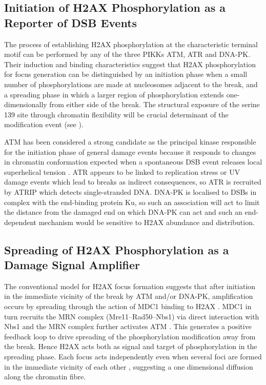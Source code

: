 \subsection{Initiation of H2AX Phosphorylation as a Reporter of DSB Events}
The process of establishing H2AX phosphorylation at the characteristic
terminal motif can be performed by any of the three PIKKs ATM, ATR and
DNA-PK\@. Their induction and binding characteristics suggest that
H2AX phosphorylation for focus generation can be distinguished by an
initiation phase when a small number of phosphorylations are made at
nucleosomes adjacent to the break, and a spreading phase in which a
larger region of phosphorylation extends one-dimensionally from either
side of the break.
The structural exposure of the serine 139 site through chromatin
flexibility will be crucial determinant of the modification event (see
).

ATM has been considered a strong candidate as the principal kinase
responsible for the initiation phase of general damage events because
it responds to changes in chromatin conformation expected when a
spontaneous DSB event releases local superhelical tension
\citep{CJB03}. ATR appears to be linked to replication stress or UV
damage events which lead to breaks as indirect consequences, so ATR is
recruited by ATRIP which detects single-stranded DNA\@. DNA-PK is
localised to DSBs in complex with the end-binding protein Ku, so such
an association will act to limit the distance from the damaged end on
which DNA-PK can act \citep{WCG01} and such an end-dependent
mechanism would be sensitive to H2AX abundance and distribution.

\subsection{Spreading of H2AX Phosphorylation as a Damage Signal Amplifier}
The conventional model for \textgamma H2AX focus formation suggests
that after initiation in the immediate vicinity of the break by ATM
and/or DNA-PK, amplification occurs by spreading through the action
of MDC1 binding to \textgamma H2AX \citep{MSJAC+05}. MDC1 in turn
recruits the MRN complex (Mre11--Rad50--Nbs1) via direct interaction
with Nbs1 \citep{LMS+04} and the MRN complex further activates ATM
\citep{ULM+03}. This generates a positive feedback loop to drive
spreading of the phosphorylation modification away from the
break. Hence H2AX acts both as signal and target of phosphorylation in
the spreading phase. Each focus acts independently even when several
foci are formed in the immediate vicinity of each other
\citep{MJK+06}, suggesting a one dimensional diffusion along the
chromatin fibre.

